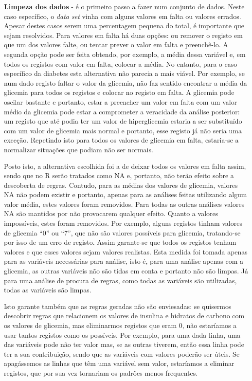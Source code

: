 \textbf{Limpeza dos dados} - é o primeiro passo a fazer num conjunto de dados. Neste caso específico, o \textit{data set} vinha com alguns valores em falta ou valores errados. Apesar destes casos serem uma percentagem pequena do total, é importante que sejam resolvidos. Para valores em falta há duas opções: ou remover o registo em que um dos valores falte, ou tentar prever o valor em falta e preenchê-lo. A segunda opção pode ser feita obtendo, por exemplo, a média dessa variável e, em todos os registos com valor em falta, colocar a média. No entanto, para o caso específico da diabetes esta alternativa não parecia a mais viável. Por exemplo, se num dado registo faltar o valor da glicemia, não faz sentido encontrar a média da glicemia para todos os registos e colocar no registo em falta. A glicemia pode oscilar bastante e portanto, estar a preencher um valor em falta com um valor médio da glicemia pode estar a comprometer a veracidade da análise posterior: um registo que até podia ter um valor de hiperglicemia estaria a ser substituído com um valor de glicemia mais normal e portanto, esse registo já não seria uma exceção. Repetindo isto para todos os valores de glicemia em falta, estaria-se a normalizar situações que podiam não ser normais. 

Posto isto, a alternativa escolhida foi a de deixar todos os valores em falta assim, sendo que no R serão tratados como \ac{NA} e, portanto, não terão efeito sobre a descoberta de regras. Contudo, para as médias dos valores de glicemia, valores \ac{NA} não podem existir e portanto, apenas para as análises feitas utilizando algum valor média, estes valores foram removidos. Para todas as outras análises valores \ac{NA} são mantidos por não provocarem qualquer efeito. Quanto a valores impossíveis, estes foram removidos. Por exemplo, alguns registos tinham valores de glicemia ``0'' ou ``7'', que não são valores possíveis para glicemia, tratando-se por isso de um erro de registo.
Assim garante-se que todos os registos tenham valores e que esses valores sejam valores realistas. Esta medida foi tomada apenas para as variáveis necessárias para análise, isto é, para uma análise apenas com a glicemia, as outras variáveis não são tidas em conta e portanto não são limpas. Já para uma análise de procura de regras, como todas as variáveis são utilizadas, todas as variáveis são limpas. 

Isto garante também que as regras geradas não são enviesadas: se quisermos descobrir regras que relacionem os valores de insulina e hidratos de carbono com os valores de glicemia, mas eliminarmos registos que eram 0, não estaríamos a usar tantos registos como os possíveis. Por exemplo, para uma dada linha, uma das variáveis pode não ter valor mas, se as outras tiverem, então essa linha pode ter a sua contribuição, sendo que as variáveis com valores poderão ser úteis. Se apagássemos as linhas que têm uma variável sem valor, estaríamos a eliminar registos, que por sua vez tornariam os padrões menos frequentes.


